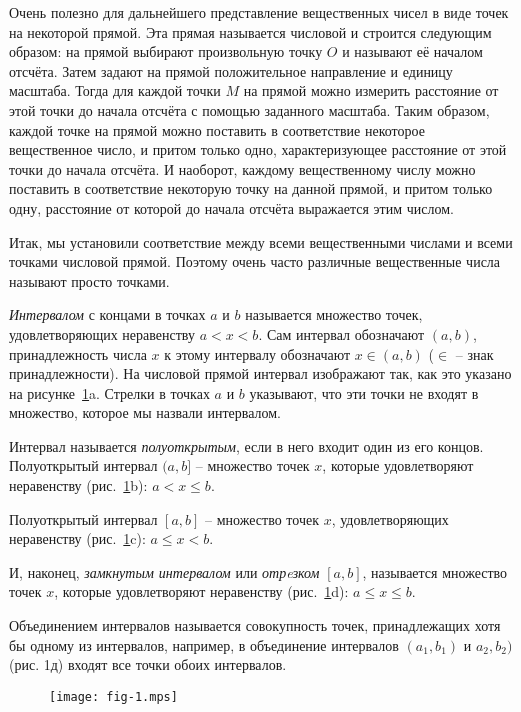 Очень полезно для дальнейшего представление вещественных чисел в виде точек на
некоторой прямой. Эта прямая называется числовой и строится следующим образом:
на прямой выбирают произвольную точку $O$ и называют её началом отсчёта. Затем
задают на прямой положительное направление и единицу масштаба. Тогда для каждой
точки $M$ на прямой можно измерить расстояние от этой точки до начала отсчёта с
помощью заданного масштаба. Таким образом, каждой точке на прямой можно
поставить в соответствие некоторое вещественное число, и притом только одно,
характеризующее расстояние от этой точки до начала отсчёта. И наоборот, каждому
вещественному числу можно поставить в соответствие некоторую точку на данной
прямой, и притом только одну, расстояние от которой до начала отсчёта
выражается этим числом.

Итак, мы установили соответствие между всеми вещественными числами и всеми
точками числовой прямой. Поэтому очень часто различные вещественные числа
называют просто точками.

\textit{Интервалом} с концами в точках $a$ и $b$ называется множество точек,
удовлетворяющих неравенству $a < x < b$. Сам интервал обозначают $(a, b)$,
принадлежность числа $x$ к этому интервалу обозначают $x \in (a, b)$ ($\in$ --
знак принадлежности). На числовой прямой интервал изображают так, как это
указано на рисунке~\ref{fig:1}a. Стрелки в точках $a$ и $b$ указывают, что эти
точки не входят в множество, которое мы назвали интервалом.

Интервал называется \textit{полуоткрытым}, если в него входит один из его
концов. Полуоткрытый интервал $(a, b]$ -- множество точек $x$, которые
удовлетворяют неравенству (рис.~\ref{fig:1}b): $a < x \leq b$.

Полуоткрытый интервал $[a, b]$ -- множество точек $x$, удовлетворяющих
неравенству (рис.~\ref{fig:1}c): $a \leq x < b$.

И, наконец, \textit{замкнутым интервалом} или \textit{отрeзком} $[a, b]$,
называется множество точек $x$, которые удовлетворяют
неравенству (рис.~\ref{fig:1}d): $a
\leq x \leq b$.

Объединением интервалов называется совокупность точек, принадлежащих хотя бы
одному из интервалов, например, в объединение интервалов $(a_1, b_1)$ и $a_2,
b_2)$ (рис. 1д) входят все точки обоих интервалов.

\begin{figure}
	\texttt{[image: fig-1.mps]}
	\centering
	\caption{}
	\label{fig:1}
\end{figure}

